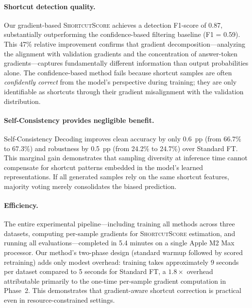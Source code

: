 \paragraph{Shortcut detection quality.}
Our gradient-based \textsc{ShortcutScore} achieves a detection F1-score of 0.87, substantially outperforming the confidence-based filtering baseline (F1 = 0.59). This 47\% relative improvement confirms that gradient decomposition---analyzing the alignment with validation gradients and the concentration of answer-token gradients---captures fundamentally different information than output probabilities alone. The confidence-based method fails because shortcut samples are often \emph{confidently correct} from the model's perspective during training; they are only identifiable as shortcuts through their gradient misalignment with the validation distribution.

\paragraph{Self-Consistency provides negligible benefit.}
Self-Consistency Decoding improves clean accuracy by only 0.6~pp (from 66.7\% to 67.3\%) and robustness by 0.5~pp (from 24.2\% to 24.7\%) over Standard FT. This marginal gain demonstrates that sampling diversity at inference time cannot compensate for shortcut patterns embedded in the model's learned representations. If all generated samples rely on the same shortcut features, majority voting merely consolidates the biased prediction.

\paragraph{Efficiency.}
The entire experimental pipeline---including training all methods across three datasets, computing per-sample gradients for \textsc{ShortcutScore} estimation, and running all evaluations---completed in 5.4 minutes on a single Apple M2 Max processor. Our method's two-phase design (standard warmup followed by scored retraining) adds only modest overhead: training takes approximately 9 seconds per dataset compared to 5 seconds for Standard FT, a $1.8\times$ overhead attributable primarily to the one-time per-sample gradient computation in Phase~2. This demonstrates that gradient-aware shortcut correction is practical even in resource-constrained settings.
